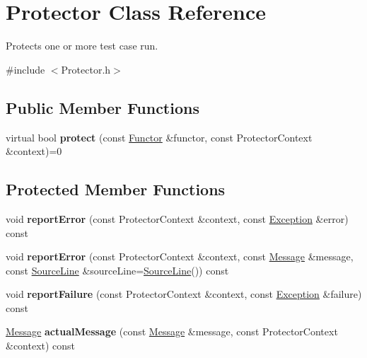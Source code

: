 \hypertarget{class_protector}{\section{Protector Class Reference}
\label{class_protector}
}


Protects one or more test case run.  




{\ttfamily \#include $<$Protector.\-h$>$}

\subsection*{Public Member Functions}
\begin{DoxyCompactItemize}
\item 
\hypertarget{class_protector_a8e005ff581ca40431526fb873a03415a}{virtual bool {\bfseries protect} (const \hyperlink{class_functor}{Functor} \&functor, const Protector\-Context \&context)=0}\label{class_protector_a8e005ff581ca40431526fb873a03415a}

\end{DoxyCompactItemize}
\subsection*{Protected Member Functions}
\begin{DoxyCompactItemize}
\item 
\hypertarget{class_protector_a94c08e57ebcf59ed093916c16384c99a}{void {\bfseries report\-Error} (const Protector\-Context \&context, const \hyperlink{class_exception}{Exception} \&error) const }\label{class_protector_a94c08e57ebcf59ed093916c16384c99a}

\item 
\hypertarget{class_protector_ab1fda7a5e61e2033e2a7b848aa04690a}{void {\bfseries report\-Error} (const Protector\-Context \&context, const \hyperlink{class_message}{Message} \&message, const \hyperlink{class_source_line}{Source\-Line} \&source\-Line=\hyperlink{class_source_line}{Source\-Line}()) const }\label{class_protector_ab1fda7a5e61e2033e2a7b848aa04690a}

\item 
\hypertarget{class_protector_ac52d8e2909a5621d2692ec3ce5d4dbc7}{void {\bfseries report\-Failure} (const Protector\-Context \&context, const \hyperlink{class_exception}{Exception} \&failure) const }\label{class_protector_ac52d8e2909a5621d2692ec3ce5d4dbc7}

\item 
\hypertarget{class_protector_a259356bbf5f03e07f75ac797c9e34737}{\hyperlink{class_message}{Message} {\bfseries actual\-Message} (const \hyperlink{class_message}{Message} \&message, const Protector\-Context \&context) const }\label{class_protector_a259356bbf5f03e07f75ac797c9e34737}

\end{DoxyCompactItemize}


